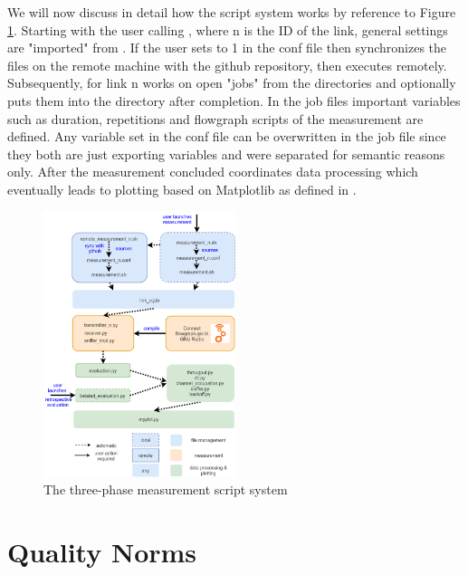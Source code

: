 We will now discuss in detail how the script system works by reference to Figure \ref{fig:script-system}.
Starting with the user calling , where n is the ID of the link, general settings are "imported" from . If the user sets  to 1 in the conf file then  synchronizes the files on the remote machine with the github repository, then executes  remotely. Subsequently,  for link n works on open "jobs" from the  directories and optionally puts them into the  directory after completion. In the job files important variables such as duration, repetitions and flowgraph scripts of the measurement are defined. Any variable set in the conf file can be overwritten in the job file since they both are just exporting variables and were separated for semantic reasons only. After the measurement concluded  coordinates data processing which eventually leads to plotting based on Matplotlib as defined in .

\begin{figure}[bt]
	\label{fig:script-system}
	\begin{center}
		\includegraphics[width=0.5\textwidth]{pictures/script_system}
	\end{center}
	\caption{The three-phase measurement script system}
\end{figure}

\clearpage

\section{Quality Norms}
\label{sec:quality-standards}

